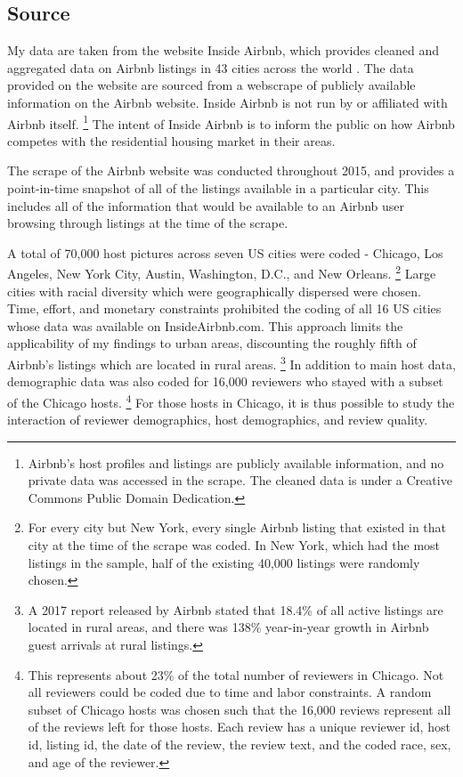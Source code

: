 \subsection{Source} 

My data are taken from the website Inside Airbnb, which provides cleaned and aggregated data on Airbnb listings in 43 cities across the world \citep{insideairbnb}. The data provided on the website are sourced from a webscrape of publicly available information on the Airbnb website. Inside Airbnb is not run by or affiliated with Airbnb itself.%
	\footnote{Airbnb's host profiles and listings are publicly available information, and no private data was accessed in the scrape. The cleaned data is under a Creative Commons Public Domain Dedication.} 
The intent of Inside Airbnb is to inform the public on how Airbnb competes with the residential housing market in their areas. 

The scrape of the Airbnb website was conducted throughout 2015, and provides a point-in-time snapshot of all of the listings available in a particular city. This includes all of the information that would be available to an Airbnb user browsing through listings at the time of the scrape. 

A total of 70,000 host pictures across seven US cities were coded - Chicago, Los Angeles, New York City, Austin, Washington, D.C., and New Orleans.%
	\footnote{For every city but New York, every single Airbnb listing that existed in that city at the time of the scrape was coded. In New York, which had the most listings in the sample, half of the existing 40,000 listings were randomly chosen.} 
Large cities with racial diversity which were geographically dispersed were chosen. Time, effort, and monetary constraints prohibited the coding of all 16 US cities whose data was available on InsideAirbnb.com. This approach limits the applicability of my findings to urban areas, discounting the roughly fifth of Airbnb's listings which are located in rural areas.%
	\footnote{A 2017 report released by Airbnb stated that 18.4\% of all active listings are located in rural areas, and there was 138\% year-in-year growth in Airbnb guest arrivals at rural listings.} 
In addition to main host data, demographic data was also coded for 16,000 reviewers who stayed with a subset of the Chicago hosts.%
	\footnote{This represents about 23\% of the total number of reviewers in Chicago. Not all reviewers could be coded due to time and labor constraints. A random subset of Chicago hosts was chosen such that the 16,000 reviews represent all of the reviews left for those hosts. Each review has a unique reviewer id, host id, listing id, the date of the review, the review text, and the coded race, sex, and age of the reviewer.}
For those hosts in Chicago, it is thus possible to study the interaction of reviewer demographics, host demographics, and review quality.


